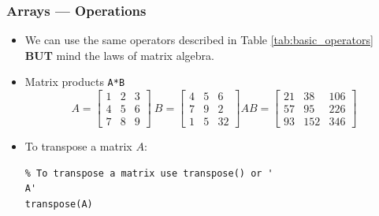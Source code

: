 \documentclass[11pt,xcolor={svgnames},aspectratio=169,usepdftitle=false]{beamer}
\begin{document}
\begin{frame}[fragile]
    \frametitle{Arrays --- Operations}
    \begin{itemize}
        \item We can use the same operators described in Table \ref{tab:basic_operators} \alert{\textbf{BUT}} mind the laws of matrix algebra.
        \item Matrix products \verb+A*B+
        \[
        A = \begin{bmatrix}
            1 & 2 & 3 \\
            4 & 5 & 6 \\
            7 & 8 & 9 
            \end{bmatrix} \ 
        B = \begin{bmatrix}
            4 & 5 & 6 \\
            7 & 9 & 2 \\
            1 & 5 & 32
            \end{bmatrix}
        AB = \begin{bmatrix}
            21 & 38 & 106 \\
            57 & 95 & 226 \\
            93 & 152 & 346
        \end{bmatrix} 
        \]
        \item To transpose a matrix $A$:
\begin{lstlisting}
% To transpose a matrix use transpose() or '
A'
transpose(A)
\end{lstlisting}
    \end{itemize}
\end{frame}
\end{document}
